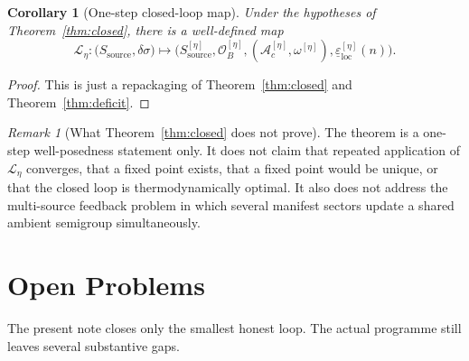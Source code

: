 \documentclass[12pt]{article}
\newtheorem{corollary}[theorem]{Corollary}
\theoremstyle{definition}
\theoremstyle{remark}
\newtheorem{remark}[theorem]{Remark}
\begin{document}
\begin{corollary}[One-step closed-loop map]
\label{cor:map}
Under the hypotheses of Theorem~\ref{thm:closed}, there is a well-defined
map
\[
\mathscr L_\eta:
\bigl(S_{\mathrm{source}},\delta\sigma\bigr)
\longmapsto
\bigl(
S_{\mathrm{source}}^{[\eta]},
\mathcal O_B^{[\eta]},
(\mathcal A_c^{[\eta]},\omega^{[\eta]}),
\underline{\varepsilon}_{\mathrm{loc}}^{[\eta]}(n)
\bigr).
\]
\end{corollary}

\begin{proof}
This is just a repackaging of Theorem~\ref{thm:closed} and
Theorem~\ref{thm:deficit}.
\end{proof}

\begin{remark}[What Theorem~\ref{thm:closed} does not prove]
The theorem is a one-step well-posedness statement only. It does not
claim that repeated application of \(\mathscr L_\eta\) converges, that a
fixed point exists, that a fixed point would be unique, or that the
closed loop is thermodynamically optimal. It also does not address the
multi-source feedback problem in which several manifest sectors update a
shared ambient semigroup simultaneously.
\end{remark}

\section{Open Problems}\label{sec:open}

The present note closes only the smallest honest loop. The actual
programme still leaves several substantive gaps.
\end{document}
